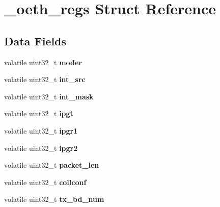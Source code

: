 \hypertarget{struct__oeth__regs}{}\section{\+\_\+oeth\+\_\+regs Struct Reference}
\label{struct__oeth__regs}
\subsection*{Data Fields}
\begin{DoxyCompactItemize}
\item 
\mbox{\label{struct__oeth__regs_a25da516d45adf38cc884dcb2e4b70ea1}} 
volatile uint32\+\_\+t {\bfseries moder}
\item 
\mbox{\label{struct__oeth__regs_a2734c8ac57a51b729f7bd11439d12a84}} 
volatile uint32\+\_\+t {\bfseries int\+\_\+src}
\item 
\mbox{\label{struct__oeth__regs_ad4d2fafc8c6a4677d4946c67f15da1d4}} 
volatile uint32\+\_\+t {\bfseries int\+\_\+mask}
\item 
\mbox{\label{struct__oeth__regs_a1cb86f10ac540f1792ad5d8ca3122567}} 
volatile uint32\+\_\+t {\bfseries ipgt}
\item 
\mbox{\label{struct__oeth__regs_ace5b02ce842349798716be37a497aa90}} 
volatile uint32\+\_\+t {\bfseries ipgr1}
\item 
\mbox{\label{struct__oeth__regs_aa6aab92468e7f2a79ac23257892dc8e6}} 
volatile uint32\+\_\+t {\bfseries ipgr2}
\item 
\mbox{\label{struct__oeth__regs_a40d6b812ae9c4d9af65638506ccd9e59}} 
volatile uint32\+\_\+t {\bfseries packet\+\_\+len}
\item 
\mbox{\label{struct__oeth__regs_aa235a3d9bc2855c807595ab3ace14e3b}} 
volatile uint32\+\_\+t {\bfseries collconf}
\item 
\mbox{\label{struct__oeth__regs_adcb7f675859cc5a0c35e9c9200c96ef7}} 
volatile uint32\+\_\+t {\bfseries tx\+\_\+bd\+\_\+num}

\end{DoxyCompactItemize}

